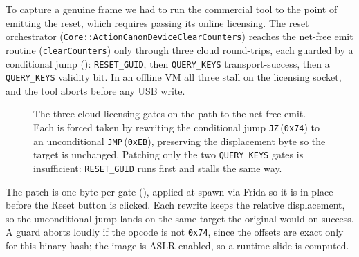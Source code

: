 \documentclass[conference]{IEEEtran}
\begin{document}
To capture a genuine frame we had to run the commercial tool to the point
of emitting the reset, which requires passing its online licensing. The
reset orchestrator (\texttt{Core::ActionCanonDeviceClearCounters}) reaches
the net-free emit routine (\texttt{clearCounters}) only through three
cloud round-trips, each guarded by a conditional jump
(): \texttt{RESET\_GUID}, then \texttt{QUERY\_KEYS}
transport-success, then a \texttt{QUERY\_KEYS} validity bit. In an offline
VM all three stall on the licensing socket, and the tool aborts before any
USB write.

\begin{figure}[ht]
\centering
{}
\caption{The three cloud-licensing gates on the path to the net-free
emit. Each is forced taken by rewriting the conditional jump
\texttt{JZ}\,(\texttt{0x74}) to an unconditional \texttt{JMP}\,(\texttt{0xEB}),
preserving the displacement byte so the target is unchanged. Patching only
the two \texttt{QUERY\_KEYS} gates is insufficient: \texttt{RESET\_GUID}
runs first and stalls the same way.}
\label{fig:gates}
\end{figure}

The patch is one byte per gate (), applied at spawn via
Frida so it is in place before the Reset button is clicked. Each rewrite
keeps the relative displacement, so the unconditional jump lands on the
same target the original would on success. A guard aborts loudly if the
opcode is not \texttt{0x74}, since the offsets are exact only for this
binary hash; the image is ASLR-enabled, so a runtime slide is computed.
\end{document}
